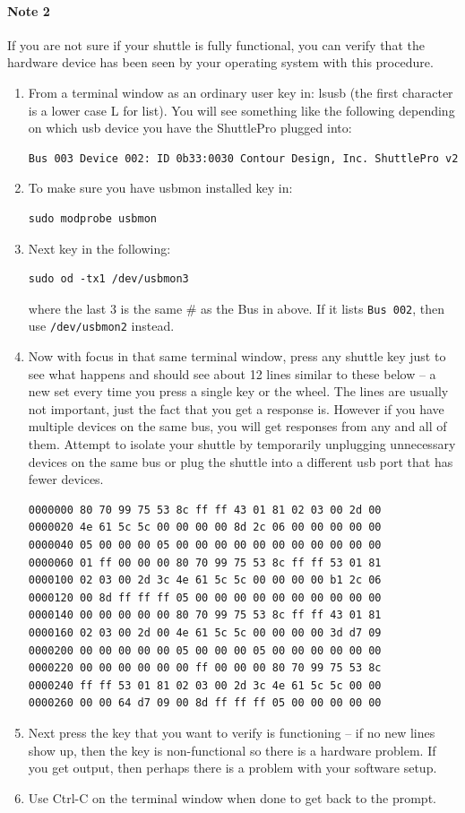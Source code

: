 \paragraph{Note 2} If you are not sure if your shuttle is fully
functional, you can verify that the hardware device has been seen by
your operating system with this procedure.
\begin{enumerate}
\item From a terminal window as an ordinary user key in: lsusb (the
  first character is a lower case L for list).  You will see
  something like the following depending on which usb device you
  have the ShuttlePro plugged into:
\begin{lstlisting}[style=sh]
Bus 003 Device 002: ID 0b33:0030 Contour Design, Inc. ShuttlePro v2
\end{lstlisting}
\item To make sure you have usbmon installed key in:
\begin{lstlisting}[style=sh]
sudo modprobe usbmon
\end{lstlisting}
\item Next key in the following:
\begin{lstlisting}[style=sh]
sudo od -tx1 /dev/usbmon3
\end{lstlisting}
  where the last 3 is the same \# as the Bus in above.  If it lists
  \texttt{Bus 002}, then use \texttt{/dev/usbmon2} instead.
\item Now with focus in that same terminal window, press any shuttle
  key just to see what happens and should see about 12 lines similar
  to these below -- a new set every time you press a single key or
  the wheel.  The lines are usually not important, just the fact
  that you get a response is.  However if you have multiple devices
  on the same bus, you will get responses from any and all of them.
  Attempt to isolate your shuttle by temporarily unplugging
  unnecessary devices on the same bus or plug the shuttle into a
  different usb port that has fewer devices.
    \begin{lstlisting}[style=sh]
0000000 80 70 99 75 53 8c ff ff 43 01 81 02 03 00 2d 00
0000020 4e 61 5c 5c 00 00 00 00 8d 2c 06 00 00 00 00 00
0000040 05 00 00 00 05 00 00 00 00 00 00 00 00 00 00 00
0000060 01 ff 00 00 00 80 70 99 75 53 8c ff ff 53 01 81
0000100 02 03 00 2d 3c 4e 61 5c 5c 00 00 00 00 b1 2c 06
0000120 00 8d ff ff ff 05 00 00 00 00 00 00 00 00 00 00
0000140 00 00 00 00 00 80 70 99 75 53 8c ff ff 43 01 81
0000160 02 03 00 2d 00 4e 61 5c 5c 00 00 00 00 3d d7 09
0000200 00 00 00 00 00 05 00 00 00 05 00 00 00 00 00 00
0000220 00 00 00 00 00 00 ff 00 00 00 80 70 99 75 53 8c
0000240 ff ff 53 01 81 02 03 00 2d 3c 4e 61 5c 5c 00 00
0000260 00 00 64 d7 09 00 8d ff ff ff 05 00 00 00 00 00
\end{lstlisting}
\item Next press the key that you want to verify is functioning --
  if no new lines show up, then the key is non-functional so there
  is a hardware problem.  If you get output, then perhaps there is a
  problem with your software setup.
\item Use Ctrl-C on the terminal window when done to get back to the
  prompt.
\end{enumerate}

